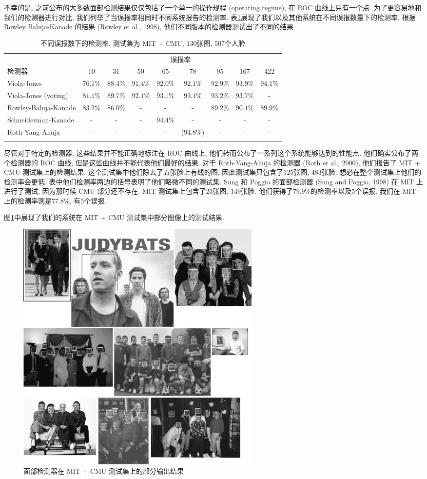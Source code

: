 \documentclass[a4paper,utf8,11pt, onecolumn]{ctexart}
\begin{document}
不幸的是, 之前公布的大多数面部检测结果仅仅包括了一个单一的操作规程 (operating regime), 在 ROC 曲线上只有一个点.
为了更容易地和我们的检测器进行对比, 我们列举了当误报率相同时不同系统报告的检测率. 表\ref{tab:false}展现了我们以及其他系统在不同误报数量下的检测率. 根据Rowley Baluja-Kanade 的结果 (Rowley et al., 1998), 他们不同版本的检测器测试出了不同的结果.
\begin{table}
\centering
\begin{tabular}{lcccccccc}
\firsthline
&\multicolumn{8}{c}{误报率} \\
\cline{2-9}
检测器 & 10 & 31 & 50 & 65 & 78 & 95 & 167 & 422 \\
\hline
Viola-Jones & $76.1\%$ & $88.4\%$ & $91.4\%$ & $92.0\%$ & $92.1\%$ & $92.9\%$ & $93.9\%$ & $94.1\%$ \\
Viola-Jones (voting) & $81.1\%$ & $89.7\%$ & $92.1\%$ & $93.1\%$ & $93.1\%$ & $93.2\%$ & $93.7\%$ & - \\
Rowley-Baluja-Kanade & $83.2\%$ & $86.0\%$ & - & - & - & $89.2\%$ & $90.1\%$ & $89.9\%$ \\
Schneiderman-Kanade & - & - & - & $94.4\%$ & - & - & - & - \\
Roth-Yang-Ahuja & - & - & - & - & ($94.8\%$) & - & - & - \\
\lasthline
\end{tabular}
\caption{不同误报数下的检测率. 测试集为 MIT + CMU, $130$张图, $507$个人脸}
\label{tab:false}
\end{table}
尽管对于特定的检测器, 这些结果并不能正确地标注在 ROC 曲线上, 他们转而公布了一系列这个系统能够达到的性能点. 他们确实公布了两个检测器的 ROC 曲线, 但是这些曲线并不能代表他们最好的结果. 
对于 Roth-Yang-Ahuja 的检测器 (Roth et al., 2000), 他们报告了 MIT + CMU 测试集上的检测结果. 这个测试集中他们除去了五张脸上有线的图, 因此测试集只包含了$125$张图, $483$张脸. 想必在整个测试集上他们的检测率会更低. 表中他们检测率两边的括号表明了他们略微不同的测试集.
Sung 和 Poggio 的面部检测器 (Sung and Poggio, 1998) 在 MIT 上进行了测试, 因为那时候 CMU 部分还不存在. MIT 测试集上包含了$23$张图, $149$张脸. 他们获得了$79.9\%$的检测率以及$5$个误报. 我们在 MIT 上的检测率则是$77.8\%$, 有$5$个误报.

图\ref{fig:output}中展现了我们的系统在 MIT + CMU 测试集中部分图像上的测试结果.
\begin{figure}[!b]
\centering
\includegraphics[width=0.6\textwidth]{output.png}
\caption{面部检测器在 MIT + CMU 测试集上的部分输出结果}
\label{fig:output}
\end{figure}
\end{document}
